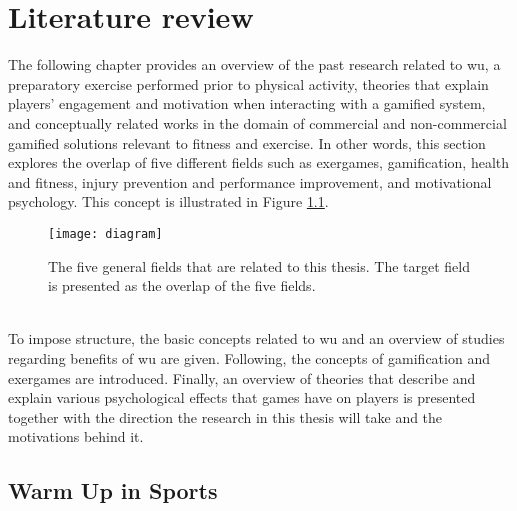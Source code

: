 \chapter{Literature review}\label{chapter:relatedwork}
The following chapter provides an overview of the past research related to \acrfull{wu}, a preparatory exercise performed prior to physical activity, theories that explain players' engagement and motivation when interacting with a gamified system, and conceptually related works in the domain of commercial and non-commercial gamified solutions relevant to fitness and exercise. In other words, this section explores the overlap of five different fields such as exergames, gamification, health and fitness, injury prevention and performance improvement, and motivational psychology. This concept is illustrated in Figure \ref{fig:diagram}.
\begin{figure}[h]
    \centering
    \texttt{[image: diagram]}
    \caption[Main research fields.]{The five general fields that are related to this thesis. The target field is presented as the overlap of the five fields.}
    \label{fig:diagram}
\end{figure}\\
To impose structure, the basic concepts related to \acrshort{wu} and an overview of studies regarding benefits of \acrshort{wu} are given. Following, the concepts of gamification and exergames are introduced. Finally, an overview of theories that describe and explain various psychological effects that games have on players is presented together with the direction the research in this thesis will take and the motivations behind it.
\section{Warm Up in Sports}
